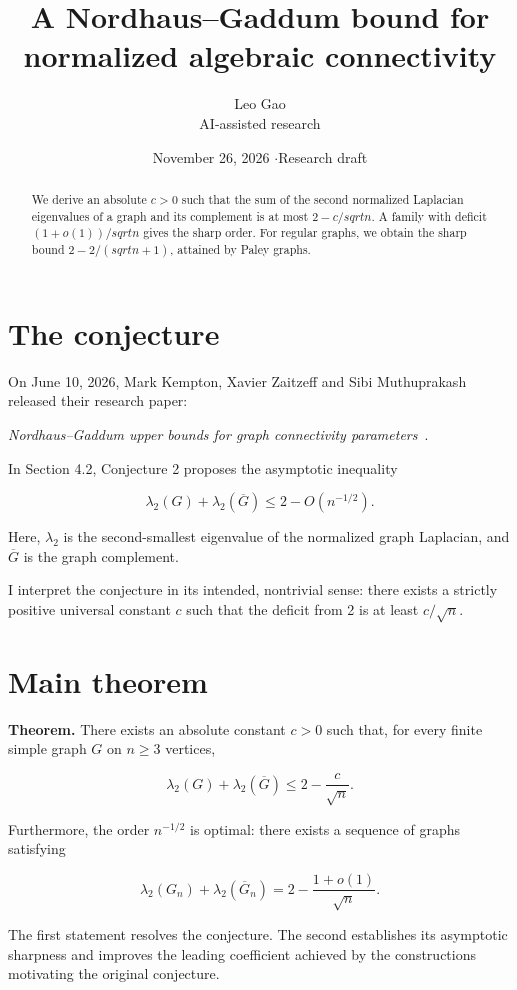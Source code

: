 \documentclass[11pt]{article}
\title{A Nordhaus--Gaddum bound for normalized algebraic connectivity}
\author{Leo Gao\\[-1pt]{\small AI-assisted research}}
\date{November 26, 2026 \quad$\cdot$\quad Research draft}
\begin{document}
\maketitle
\begin{abstract}
We derive an absolute $c>0$ such that the sum of the second normalized Laplacian eigenvalues of a graph and its complement is at most $2-c/sqrt n$. A family with deficit $(1+o(1))/sqrt n$ gives the sharp order. For regular graphs, we obtain the sharp bound $2-2/(sqrt n+1)$, attained by Paley graphs.
\end{abstract}
\section{The conjecture}

On June 10, 2026, Mark Kempton, Xavier Zaitzeff and Sibi Muthuprakash released their research paper:

\emph{Nordhaus--Gaddum upper bounds for graph connectivity parameters}~\cite{KZM}.

In Section 4.2, Conjecture 2 proposes the asymptotic inequality

\[
\lambda_2(G)+\lambda_2(\overline G)
\leq 2-O(n^{-1/2}).
\]

Here, \(\lambda_2\) is the second-smallest eigenvalue of the normalized graph Laplacian, and \(\overline G\) is the graph complement.

I interpret the conjecture in its intended, nontrivial sense: there exists a strictly positive universal constant \(c\) such that the deficit from 2 is at least \(c/\sqrt n\).

\section{Main theorem}

\textbf{Theorem.} There exists an absolute constant \(c>0\) such that, for every finite simple graph \(G\) on \(n\geq 3\) vertices,

\[
\boxed{
\lambda_2(G)+\lambda_2(\overline G)
\leq 2-\frac{c}{\sqrt n}.
}
\]

Furthermore, the order \(n^{-1/2}\) is optimal: there exists a sequence of graphs satisfying

\[
\boxed{
\lambda_2(G_n)+\lambda_2(\overline G_n)
=2-\frac{1+o(1)}{\sqrt n}.
}
\]

The first statement resolves the conjecture. The second establishes its asymptotic sharpness and improves the leading coefficient achieved by the constructions motivating the original conjecture.
\end{document}
